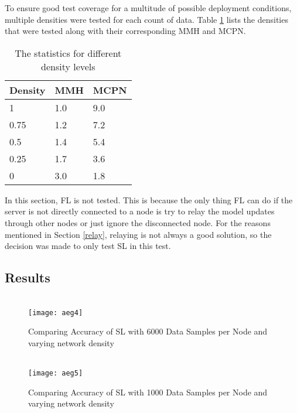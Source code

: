 To ensure good test coverage for a multitude of possible deployment conditions, multiple densities were tested for each count of data. Table \ref{sparsedensities} lists the densities that were tested along with their corresponding MMH and MCPN.

\begin{table}[H]
	\centering
	\begin{tabular}{l|l|l}
		Density & MMH & MCPN \\ \hline
		1 & 1.0 & 9.0 \\
		0.75    & 1.2 & 7.2  \\
		0.5    & 1.4 & 5.4  \\
		0.25    & 1.7 & 3.6  \\
		0    & 3.0 & 1.8  \\
	\end{tabular}
	\caption{The statistics for different density levels} \label{sparsedensities}
\end{table}

In this section, FL is not tested. This is because the only thing FL can do if the server is not directly connected to a node is try to relay the model updates through other nodes or just ignore the disconnected node. For the reasons mentioned in Section \ref{relay}, relaying is not always a good solution, so the decision was made to only test SL in this test.

\subsection{Results}


\begin{figure}[H] 
	 \\
	\texttt{[image: aeg4]}
	\caption{Comparing Accuracy of SL with 6000 Data Samples per Node and varying network density}
	\label{aeg4}
\end{figure}

\begin{figure}[H]
	 \\
	\texttt{[image: aeg5]}
	\caption{Comparing Accuracy of SL with 1000 Data Samples per Node and varying network density}
	\label{aeg5}
\end{figure}

